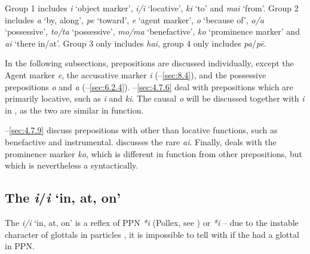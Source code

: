 
Group 1 includes \textit{i} ‘object marker’, \textit{i/{\ꞌ}i} ‘locative’, \textit{ki} ‘to’ and \textit{mai} ‘from’. Group 2 includes \textit{a} ‘by, along’, \textit{pe} ‘toward’, \textit{e} ‘agent marker’, \textit{{\ꞌ}o} ‘because of’, \textit{o/{\ꞌ}a} ‘possessive’, \textit{to/ta} ‘possessive’, \textit{mo/ma} ‘benefactive’, \textit{ko} ‘prominence marker’ and \textit{{\ꞌ}ai} ‘there in/at’. Group 3 only includes \textit{hai}, group 4 only includes \textit{pa}/\textit{pē}. 

In the following subsections, prepositions are discussed individually, except the Agent marker \textit{e}, the accusative marker \textit{i} (–\ref{sec:8.4}), and the possessive prepositions \textit{o} and \textit{{\ꞌ}a} (–\ref{sec:6.2.4}). –\ref{sec:4.7.6} deal with prepositions which are primarily locative, such as \textit{{\ꞌ}i} and \textit{ki}. The causal  \textit{{\ꞌ}o} will be discussed together with \textit{{\ꞌ}i} in , as the two are similar in function.

–\ref{sec:4.7.9} discuss prepositions with other than locative functions, such as benefactive and instrumental.  discusses the rare  \textit{{\ꞌ}ai}. Finally,  deals with the prominence marker \textit{ko}, which is different in function from other prepositions, but which is nevertheless a  syntactically.

\subsection{The  \textit{{\ꞌ}i}/\textit{i} ‘in, at, on’}\label{sec:4.7.2}

The  \textit{{\ꞌ}i/i} ‘in, at, on’ is a reflex of PPN \textit{*{\ꞌ}i} (Pollex, see \citealt{GreenhillClark2011}) or \textit{*i} \citep[41]{Clark1976} – due to the instable character of glottals in particles \citep[22]{Clark1976}, it is impossible to tell with  if the  had a glottal in PPN. 

